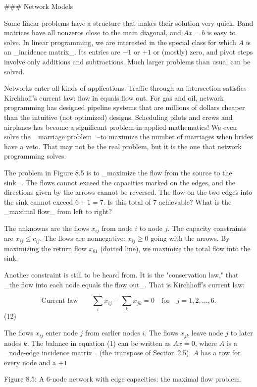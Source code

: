 

### Network Models

Some linear problems have a structure that makes their solution very quick. Band matrices have all nonzeros close to the main diagonal, and \(Ax=b\) is easy to solve. In linear programming, we are interested in the special class for which \(A\) is an _incidence matrix_. Its entries are \(-1\) or \(+1\) or (mostly) zero, and pivot steps involve only additions and subtractions. Much larger problems than usual can be solved.

Networks enter all kinds of applications. Traffic through an intersection satisfies Kirchhoff's current law: flow in equals flow out. For gas and oil, network programming has designed pipeline systems that are millions of dollars cheaper than the intuitive (not optimized) designs. Scheduling pilots and crews and airplanes has become a significant problem in applied mathematics! We even solve the _marriage problem_--to maximize the number of marriages when brides have a veto. That may not be the real problem, but it is the one that network programming solves.

The problem in Figure 8.5 is to _maximize the flow from the source to the sink_. The flows cannot exceed the capacities marked on the edges, and the directions given by the arrows cannot be reversed. The flow on the two edges into the sink cannot exceed \(6+1=7\). Is this total of 7 achievable? What is the _maximal flow_ from left to right?

The unknowns are the flows \(x_{ij}\) from node \(i\) to node \(j\). The capacity constraints are \(x_{ij}\leq c_{ij}\). The flows are nonnegative: \(x_{ij}\geq 0\) going with the arrows. By maximizing the return flow \(x_{61}\) (dotted line), we maximize the total flow into the sink.

Another constraint is still to be heard from. It is the "conservation law," that _the flow into each node equals the flow out_. That is Kirchhoff's current law:

\[\mbox{{Current law}}\qquad\sum_{i}x_{ij}-\sum_{k}x_{jk}=0\quad\mbox{for}\quad j =1,2,\ldots,6.\] (12)

The flows \(x_{ij}\) enter node \(j\) from earlier nodes \(i\). The flows \(x_{jk}\) leave node \(j\) to later nodes \(k\). The balance in equation (1) can be written as \(Ax=0\), where \(A\) is a _node-edge incidence matrix_ (the transpose of Section 2.5). \(A\) has a row for every node and a \(+1\)

Figure 8.5: A \(6\)-node network with edge capacities: the maximal flow problem.

